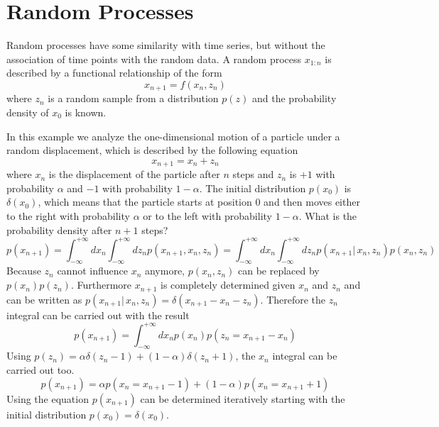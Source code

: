 \documentclass{tstextbook}
\begin{document}
\section{Random Processes}
Random processes have some similarity with time series, but without the association of time points with the random data. A random process $x_{1:n}$ is described by a functional relationship of the form
\begin{equation}
x_{n+1} = f\left(x_{n},z_{n}\right)
\end{equation}
where $z_{n}$ is a random sample from a distribution $p(z)$ and the probability density of $x_0$ is known.

\begin{example}
In this example we analyze the one-dimensional motion of a particle under a random displacement, which is described by the following equation 
\begin{equation}
x_{n+1} = x_{n} + z_{n}
\end{equation}
where $x_n$ is the displacement of the particle after $n$ steps and $z_n$ is $+1$ with probability $\alpha$ and $-1$ with probability $1-\alpha$. The initial distribution $p\left(x_0\right)$ is $\delta\left(x_0\right)$, which means that the particle starts at position $0$ and then moves either to the right with probability $\alpha$ or to the left with probability $1-\alpha$. What is the probability density after $n+1$ steps?\\
\begin{equation}
p\left(x_{n+1}\right)=\int_{-\infty}^{+\infty}dx_{n}\int_{-\infty}^{+\infty}dz_{n}p\left(x_{n+1},x_{n},z_{n}\right) = \int_{-\infty}^{+\infty}dx_{n}\int_{-\infty}^{+\infty}dz_{n}p\left(x_{n+1}\vert\,x_{n},z_{n}\right)p\left(x_{n},z_{n}\right)
\end{equation}
Because $z_{n}$ cannot influence $x_{n}$ anymore, $p\left(x_{n},z_{n}\right)$ can be replaced by $p\left(x_{n}\right)p\left(z_{n}\right)$. Furthermore $x_{n+1}$ is completely determined given $x_{n}$ and $z_{n}$ and can be written as
$p\left(x_{n+1}\vert\,x_{n},z_{n}\right)=\delta\left(x_{n+1}-x_{n}-z_{n}\right)$.
Therefore the $z_{n}$ integral can be carried out with the result
\begin{equation}
p\left(x_{n+1}\right)= \int_{-\infty}^{+\infty}dx_{n}p\left(x_{n}\right)p\left(z_{n}=x_{n+1}-x_{n}\right)
\end{equation}
Using $p\left(z_{n}\right)=\alpha\delta(z_{n}-1)+(1-\alpha)\delta(z_{n}+1)$, the $x_{n}$ integral can be carried out too.
\begin{equation}
p\left(x_{n+1}\right)= \alpha p\left(x_{n}=x_{n+1}-1\right)+(1-\alpha) p\left(x_{n}=x_{n+1}+1\right)
\end{equation}
Using the equation $p\left(x_{n+1}\right)$ can be determined iteratively starting with the initial distribution $p\left(x_{0}\right)=\delta\left(x_{0}\right)$.


\end{example}
\end{document}
